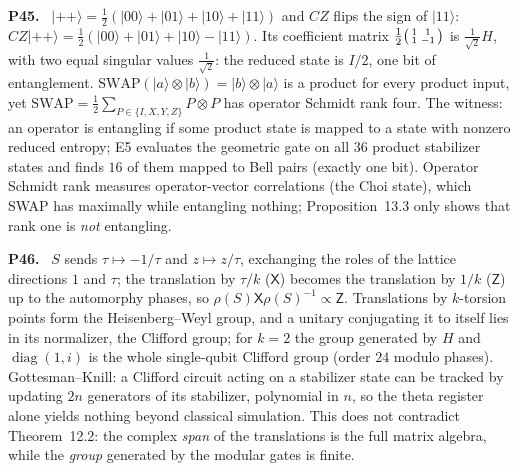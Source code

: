 \documentclass[11pt]{article}
\newenvironment{solution}[1]{\medskip\noindent\textbf{P#1.}\ }{\par\medskip}
\begin{document}
\begin{solution}{45}
$|{+}{+}\rangle = \tfrac12(|00\rangle+|01\rangle+|10\rangle+|11\rangle)$ and $CZ$ flips
the sign of $|11\rangle$: $CZ|{+}{+}\rangle = \tfrac12(|00\rangle+|01\rangle+|10\rangle-|11\rangle)$.
Its coefficient matrix $\tfrac12\begin{psmallmatrix}1&1\\1&-1\end{psmallmatrix}$
is $\tfrac1{\sqrt2}H$, with two equal singular values $\tfrac1{\sqrt2}$: the
reduced state is $I/2$, one bit of entanglement. $\mathrm{SWAP}(|a\rangle\otimes|b\rangle) = |b\rangle\otimes|a\rangle$
is a product for every product input, yet $\mathrm{SWAP} = \tfrac12\sum_{P\in\{I,X,Y,Z\}}P\otimes P$
has operator Schmidt rank four. The witness: an operator is entangling if
some product state is mapped to a state with nonzero reduced entropy; E5
evaluates the geometric gate on all $36$ product stabilizer states and finds
$16$ of them mapped to Bell pairs (exactly one bit). Operator Schmidt rank
measures operator-vector correlations (the Choi state), which SWAP has
maximally while entangling nothing; Proposition~13.3 only shows that rank
one is \emph{not} entangling.
\end{solution}

\begin{solution}{46}
$S$ sends $\tau\mapsto-1/\tau$ and $z\mapsto z/\tau$, exchanging the roles of the
lattice directions $1$ and $\tau$; the translation by $\tau/k$ ($\mathsf X$)
becomes the translation by $1/k$ ($\mathsf Z$) up to the automorphy phases, so
$\rho(S)\mathsf X\rho(S)^{-1}\propto\mathsf Z$. Translations by $k$-torsion points
form the Heisenberg--Weyl group, and a unitary conjugating it to itself lies in
its normalizer, the Clifford group; for $k=2$ the group generated by $H$ and
$\operatorname{diag}(1,i)$ is the whole single-qubit Clifford group (order $24$
modulo phases). Gottesman--Knill: a Clifford circuit acting on a stabilizer
state can be tracked by updating $2n$ generators of its stabilizer, polynomial
in $n$, so the theta register alone yields nothing beyond classical simulation.
This does not contradict Theorem~12.2: the complex \emph{span} of the
translations is the full matrix algebra, while the \emph{group} generated by
the modular gates is finite.
\end{solution}
\end{document}
